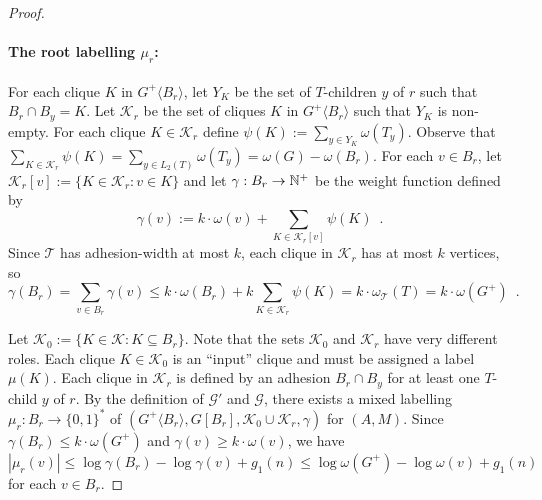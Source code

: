 \documentclass{patmorin}
\renewcommand{\ge}{\geqslant}
\renewcommand{\le}{\leqslant}
\newcommand{\pat}[1]{\textcolor{Magenta}{PaMo: #1}}
\newcommand{\gwen}[1]{\textcolor{Purple}{GJ: #1}}
\newcommand{\piotr}[1]{\textcolor{red}{PiMi: #1}}
\newcommand{\torso}[2]{{#1}\langle{#2}\rangle}
\begin{document}
\begin{proof}
    \paragraph{\boldmath The root labelling $\mu_r$:}
    For each clique $K$ in $\torso{G^+}{B_r}$, let $Y_K$ be the set of $T$-children $y$ of $r$ such that $B_r\cap B_y=K$.
    Let $\mathcal{K}_r$ be the set of cliques $K$ in $\torso{G^+}{B_r}$ such that $Y_K$ is non-empty.
    For each clique $K\in\mathcal{K}_r$ define
    $\psi(K):=\sum_{y\in Y_K}\omega(T_y)$.  Observe that $\sum_{K\in\mathcal{K}_r}\psi(K)=\sum_{y\in L_2(T)}\omega(T_y)=\omega(G)-\omega(B_r)$.
    For each $v\in B_r$, let $\mathcal{K}_r[v]:=\{K\in\mathcal{K}_r:v\in K\}$ and let $\gamma:B_r\to\mathbb{N}^+$ be the weight function defined by
    \[
       \gamma(v):=k\cdot\omega(v)+\sum_{K\in\mathcal{K}_r[v]}\psi(K) \enspace .
    \]
    Since $\mathcal{T}$ has adhesion-width at most $k$, each clique in $\mathcal{K}_r$ has at most $k$ vertices, so
    \[
       \gamma(B_r)=\sum_{v\in B_r}\gamma(v)
       \le k\cdot\omega(B_r) + k\sum_{K\in\mathcal{K}_r}\psi(K) = k\cdot\omega_{\mathcal{T}}(T) = k\cdot\omega(G^+) \enspace .
    \]


    Let $\mathcal{K}_0:=\{K\in\mathcal{K}: K\subseteq B_r\}$.
    Note that the sets $\mathcal{K}_0$ and $\mathcal{K}_r$ have very different roles.
    Each clique $K\in\mathcal{K}_0$ is an ``input'' clique and must be assigned a label $\mu(K)$.
    Each clique in $\mathcal{K}_r$ is defined by an adhesion $B_r\cap B_y$ for at least one $T$-child $y$ of $r$.
    By the definition of $\mathcal{G}'$ and $\mathcal{G}$,
    there exists a
    mixed labelling $\mu_r:B_r\to\{0,1\}^*$ of $(\torso{G^+}{B_r}, G[B_r], \mathcal{K}_0\cup\mathcal{K}_r, \gamma)$ for $(A, M)$.
    Since $\gamma(B_r)\le k\cdot\omega(G^+)$ and $\gamma(v)\ge k\cdot\omega(v)$, we have
    \[
       |\mu_r(v)|\le \log \gamma(B_r)-\log\gamma(v)+g_1(n)\le \log \omega(G^+) - \log \omega(v) + g_1(n)
    \]
    for each $v\in B_r$.


\end{proof}
\end{document}
